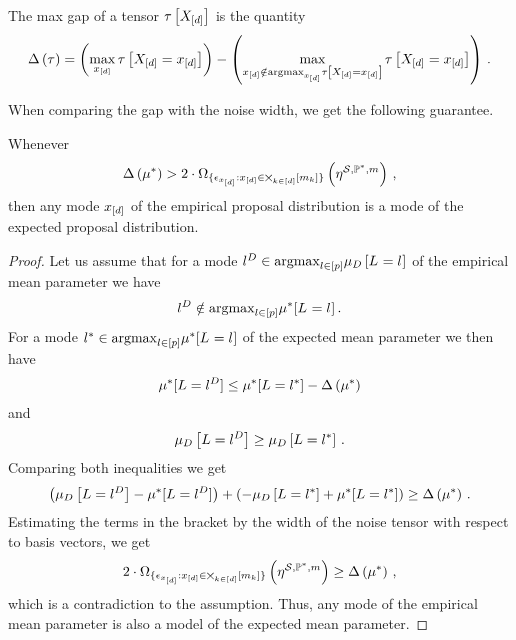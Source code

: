 \begin{definition}
    The max gap of a tensor $\tau\left[X_{[d]}\right]$ is the quantity
    \begin{align*}
        \Delta\left(\tau\right) =
        \left(\max_{x_{[d]}} \tau\left[X_{[d]}=x_{[d]}\right]\right) -
        \left(\max_{x_{[d]}\notin\mathrm{argmax}_{x_{[d]}}\tau\left[X_{[d]}=x_{[d]}\right]}
        \tau\left[X_{[d]}=x_{[d]}\right]\right) \, .
    \end{align*}
\end{definition}

When comparing the gap with the noise width, we get the following guarantee.

\begin{theorem}
    \label{the:detGuaranteeProposalDist}
    Whenever
    \begin{align*}
        \Delta\left(\mu^*\right)
        > 2 \cdot \Omega_{\{\epsilon_{x_{[d]}}:x_{[d]}\in\bigtimes_{k\in[d]}[m_{k}]\}}\left(\eta^{\mathcal{S},\mathbb{P}^*,m}\right) \, ,
    \end{align*}
    then any mode $x_{[d]}$ of the empirical proposal distribution is a mode of the expected proposal distribution.
\end{theorem}
\begin{proof}
    Let us assume that for a mode $l^{D}\in\mathrm{argmax}_{l\in[p]}\mu_{D}\left[L_{}=l_{}\right]$ of the empirical mean parameter we have
    \begin{align*}
        l^{D}\notin\mathrm{argmax}_{l\in[p]}\mu^*[L_{}=l_{}] \, .
    \end{align*}
    For a mode $l^{*}\in\mathrm{argmax}_{l\in[p]}\mu^*[L_{}=l_{}]$ of the expected mean parameter we then have
    \begin{align*}
        \mu^*[L=l^{D}] \leq \mu^*[L=l^{*}] - \Delta\left(\mu^*\right)
    \end{align*}
    and
    \begin{align*}
        \mu_{D}\left[L=l^{D}\right] \geq \mu_{D}\left[L=l^{*}\right] \, .
    \end{align*}
    Comparing both inequalities we get
    \begin{align*}
        \left(\mu_{D}\left[L=l^{D}\right] - \mu^*[L=l^{D}]\right)
        + \left( - \mu_{D}\left[L=l^{*}\right] + \mu^*[L=l^{*}] \right)
        \geq \Delta\left(\mu^*\right) \, .
    \end{align*}
    Estimating the terms in the bracket by the width of the noise tensor with respect to basis vectors, we get
    \begin{align*}
        2 \cdot  \Omega_{\{\epsilon_{x_{[d]}}:x_{[d]}\in\bigtimes_{k\in[d]}[m_{k}]\}}\left(\eta^{\mathcal{S},\mathbb{P}^*,m}\right)
        \geq \Delta\left(\mu^*\right) \, ,
    \end{align*}
    which is a contradiction to the assumption.
    Thus, any mode of the empirical mean parameter is also a model of the expected mean parameter.
\end{proof}


